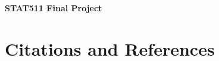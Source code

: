 \documentclass[a4paper,12pt]{article}
\begin{document}
\thispagestyle{plain}
\begin{center}
    \Large
    \textbf{STAT511 Final Project}
        
    \vspace{0.4cm}
    
       
    \vspace{0.9cm}
   
\end{center}



\appendix


\section{Citations and References}



\end{document}
